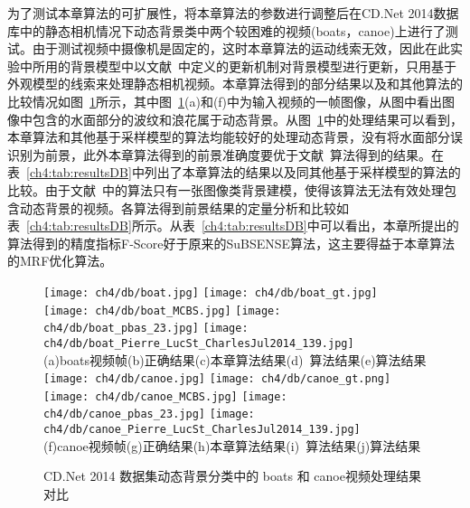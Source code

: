 为了测试本章算法的可扩展性，将本章算法的参数进行调整后在CD.Net 2014数据库中的静态相机情况下动态背景类中两个较困难的视频(boats，canoe)上进行了测试。由于测试视频中摄像机是固定的，这时本章算法的运动线索无效，因此在此实验中所用的背景模型中以文献~中定义的更新机制对背景模型进行更新，只用基于外观模型的线索来处理静态相机视频。本章算法得到的部分结果以及和其他算法的比较情况如图~\ref{ch4:fig:dbresults}所示，其中图~\ref{ch4:fig:dbresults}(a)和(f)中为输入视频的一帧图像，从图中看出图像中包含的水面部分的波纹和浪花属于动态背景。从图~\ref{ch4:fig:dbresults}中的处理结果可以看到，本章算法和其他基于采样模型的算法\cite{pbas,subsenseTIP}均能较好的处理动态背景，没有将水面部分误识别为前景，此外本章算法得到的前景准确度要优于文献~算法得到的结果。在表~\ref{ch4:tab:resultsDB}中列出了本章算法的结果以及同其他基于采样模型的算法的比较。由于文献~中的算法只有一张图像类背景建模，使得该算法无法有效处理包含动态背景的视频。各算法得到前景结果的定量分析和比较如表~\ref{ch4:tab:resultsDB}所示。从表~\ref{ch4:tab:resultsDB}中可以看出，本章所提出的算法得到的精度指标F-Score好于原来的SuBSENSE算法\cite{subsenseTIP}，这主要得益于本章算法的MRF优化算法。
\begin{figure}
  \centering
  \texttt{[image: ch4/db/boat.jpg]}
  \texttt{[image: ch4/db/boat\_gt.jpg]}
  \texttt{[image: ch4/db/boat\_MCBS.jpg]}
  \texttt{[image: ch4/db/boat\_pbas\_23.jpg]}
  \texttt{[image: ch4/db/boat\_Pierre\_LucSt\_CharlesJul2014\_139.jpg]}\\
  (a)boats视频帧(b)正确结果(c)本章算法结果(d)~算法结果(e)算法结果 \\
  \texttt{[image: ch4/db/canoe.jpg]}
  \texttt{[image: ch4/db/canoe\_gt.png]}
  \texttt{[image: ch4/db/canoe\_MCBS.jpg]}
  \texttt{[image: ch4/db/canoe\_pbas\_23.jpg]}
  \texttt{[image: ch4/db/canoe\_Pierre\_LucSt\_CharlesJul2014\_139.jpg]}\\
  (f)canoe视频帧(g)正确结果(h)本章算法结果(i)~算法结果(j)算法结果 \\
  \caption{CD.Net 2014\cite{CD2014} 数据集动态背景分类中的 boats 和 canoe视频处理结果对比}\label{ch4:fig:dbresults}
\end{figure}


